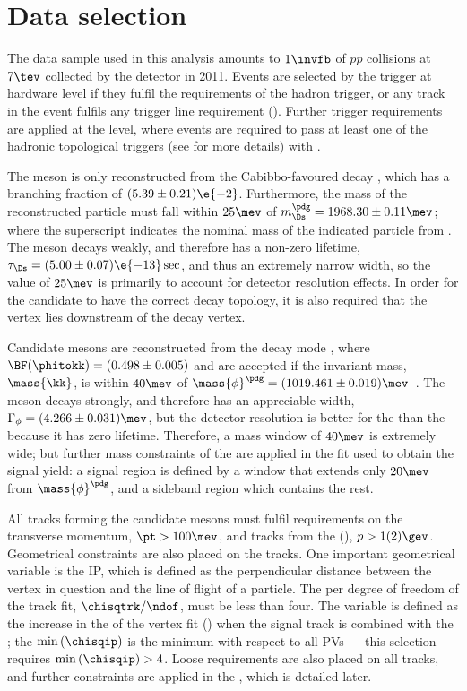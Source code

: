 \section{Data selection}
\label{sec:dsphi:sel}

The data sample used in this analysis amounts to
$1\invfb$ of $pp$ collisions at $7\tev$ collected by the \lhcb detector in 2011.
Events are selected by the trigger at hardware level if they fulfil the requirements of the \lone
hadron trigger, or any track in the event fulfils any \lone trigger line requirement (\tis).
Further trigger requirements are applied at the \hlttwo level, where events are required to pass at
least one of the hadronic topological triggers (see  for more details) with
\tos.

The \Ds meson is only reconstructed from the Cabibbo-favoured decay \dstokkpi,
which has a branching fraction of $(5.39\pm0.21)\e{-2}$.
Furthermore, the mass of the reconstructed particle must fall within $25\mev$ of
$m_{\Ds}^\pdg=1968.30\pm0.11\mev$; where the superscript \pdg indicates the nominal mass of the
indicated particle from .
The \Ds meson decays weakly, and therefore has a non-zero lifetime,
$\tau_{\Ds}=(5.00\pm0.07)\e{-13}\sec$, and thus an extremely narrow width, so the value of $25\mev$
is primarily to account for detector resolution effects.
In order for the candidate to have the correct decay topology, it is also required that the \Ds
vertex lies downstream of the \Bp decay vertex.

Candidate \phii mesons are reconstructed from the decay mode \phitokk, where
$\BF(\phitokk)=(0.498\pm0.005)$ and are accepted if the
invariant \kk mass, $\mass{\kk}$, is within $40\mev$ of
$\mass{\phi}^\pdg=(1019.461\pm0.019)\mev$~\cite{PDG2012}.
The \phii meson decays strongly, and therefore has an appreciable width,
$\Gamma_\phi=(4.266\pm0.031)\mev$, but the detector resolution is better for the \phii than the \Ds
because it has zero lifetime.
Therefore, a mass window of $40\mev$ is extremely wide; but further mass constraints of the \phii
are applied in the fit used to obtain the signal yield: a signal region is defined by a window that
extends only $20\mev$ from $\mass{\phi}^\pdg$, and a sideband region which contains the rest.

All tracks forming the candidate mesons must fulfil requirements on the transverse momentum,
$\pt>100\mev$, and tracks from the \Ds(\phii), $p>1(2)\gev$.
Geometrical constraints are also placed on the tracks.
One important geometrical variable is the \gls{IP}, which is defined as the perpendicular distance
between the vertex in question and the line of flight of a particle.
The \chisq per degree of freedom of the track fit, $\chisqtrk/\ndof$, must be less than four.
The variable \chisqip is defined as the increase in the \chisq of the vertex fit (\chisqvtx) when
the signal track is combined with the \pv; the $\min\left(\chisqip\right)$ is the minimum \chisqip
with respect to all \glspl{PV} --- this selection requires $\min\left(\chisqip\right)>4$.
Loose \pid requirements are also placed on all tracks, and further \pid constraints are applied in
the \bdt, which is detailed later.


